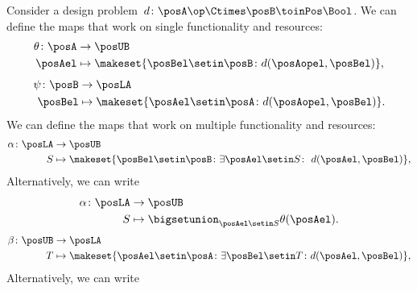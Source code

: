 Consider a design problem~$d\colon \posA\op \Ctimes \posB \toinPos \Bool$.
We can define the maps that work on single functionality and resources:
%
\begin{equation}
    \begin{aligned}
        \theta\colon \posA & \to \posUB \\
        \posAel            & \mapsto \makeset{\posBel\setin \posB \colon d(\posAopel, \posBel) },
    \end{aligned}
\end{equation}
%
\begin{equation}
    \begin{aligned}
        \psi\colon \posB & \to \posLA \\
        \posBel          & \mapsto \makeset{\posAel\setin \posA \colon d(\posAopel, \posBel) }.
    \end{aligned}
\end{equation}
We can define the maps that work on multiple functionality and resources:
\begin{equation}
    \label{eq:galoisalfa}
    \begin{aligned}
        \alpha\colon \posLA & \to \posUB \\
        S                   & \mapsto \makeset{\posBel\setin \posB \colon \exists \posAel\setin S\colon \ d(\posAel,\posBel)},
    \end{aligned}
\end{equation}
Alternatively, we can write
\begin{equation}
    \begin{aligned}
        \alpha \colon \posLA & \to \posUB \\
        S                    & \mapsto \bigsetunion_{\posAel\setin S} \theta(\posAel).
    \end{aligned}
\end{equation}
%
\begin{equation}
    \label{eq:galoisbeta}
    \begin{aligned}
        \beta\colon \posUB & \to \posLA \\
        T                  & \mapsto \makeset{\posAel\setin \posA  \colon \exists \posBel\setin T\colon d(\posAel,\posBel)},
    \end{aligned}
\end{equation}
%
\noindent Alternatively, we can write
